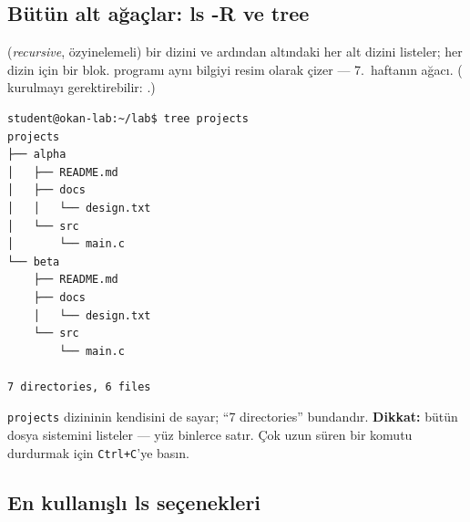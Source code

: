 \subsection{Bütün alt ağaçlar: ls -R ve tree}

 (\emph{recursive}, özyinelemeli) bir dizini ve ardından altındaki her alt dizini listeler; her dizin için bir blok.  programı aynı bilgiyi resim olarak çizer --- 7.\ haftanın ağacı. ( kurulmayı gerektirebilir: .)


\begin{tcolorbox}[enhanced,colback=dark,colframe=dark,arc=0pt,boxrule=0pt,left=6pt,right=6pt,top=4pt,bottom=4pt,coltext=light,fontupper=\footnotesize]
\begin{verbatim}
student@okan-lab:~/lab$ tree projects
projects
├── alpha
│   ├── README.md
│   ├── docs
│   │   └── design.txt
│   └── src
│       └── main.c
└── beta
    ├── README.md
    ├── docs
    │   └── design.txt
    └── src
        └── main.c

7 directories, 6 files
\end{verbatim}
\end{tcolorbox}

 \texttt{projects} dizininin kendisini de sayar; ``7 directories'' bundandır. \textbf{Dikkat:}  bütün dosya sistemini listeler --- yüz binlerce satır. Çok uzun süren bir komutu durdurmak için \texttt{Ctrl+C}'ye basın.

\subsection{En kullanışlı ls seçenekleri}

